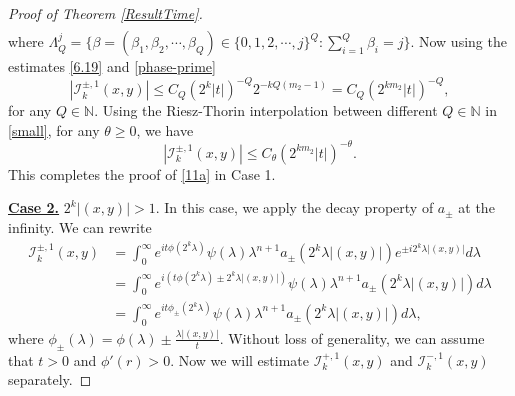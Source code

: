 \documentclass[a4paper,11pt, reqno]{amsart}
\numberwithin{equation}{section}
\theoremstyle{plain}
\theoremstyle{definition}
\theoremstyle{remark}
\begin{document}
\begin{proof}[Proof of Theorem \ref{ResultTime}]
\begin{equation*}
\begin{aligned}
    \end{aligned}
	\end{equation*}
 where $\Lambda_Q^j=\{\beta=(\beta_1,\beta_2,\cdots,\beta_Q)\in\{0,1,2,\cdots,j\}^Q: \sum\limits_{i=1}^Q\beta_i=j\}$. Now using the estimates \eqref{6.19} and \eqref{phase-prime}
 \begin{equation}\label{small}
|\mathcal{I}_k^{\pm,1}(x,y)|\leq C_Q \left(2^k|t|\right)^{-Q}2^{-kQ(m_2-1)}=C_Q\left(2^{km_2}|t|\right)^{-Q}, 
 \end{equation} for any $Q\in \mathbb N$. Using the Riesz-Thorin interpolation between different $Q\in\mathbb{N}$ in \eqref{small}, for any $\theta\geq0$, we have
\begin{equation}\label{sharp-s-small}
|\mathcal{I}_k^{\pm,1}(x,y)|\leq C_\theta\left(2^{km_2}|t|\right)^{-\theta}.
 \end{equation}  
 This completes the proof of \eqref{11a} in Case 1.   
 
\textbf{\underline{Case 2.}} $2^k|(x,y)|>1$. In this case, we apply the decay property of $a_\pm$ at the infinity. We can rewrite
\begin{align*}
\mathcal{I}_k^{\pm,1}(x,y)&=\int_0^\infty e^{it\phi(2^k\lambda)} \psi(\lambda)\lambda^{n+1}a_{\pm}(2^k\lambda|(x,y)|)e^{\pm i2^k\lambda|(x,y)|}d\lambda\\
   &=\int_0^\infty  e^{i\left(t\phi(2^k\lambda)\pm 2^k\lambda|(x,y)|\right)}\psi(\lambda)\lambda^{n+1}a_{\pm}(2^k\lambda|(x,y)|)d\lambda\\
   &=\int_0^\infty   e^{it\phi_\pm(2^k\lambda)}\psi(\lambda)\lambda^{n+1}a_{\pm}(2^k\lambda|(x,y)|)d\lambda,
\end{align*}
where $\phi_\pm(\lambda)=\phi(\lambda)\pm \frac{\lambda |(x,y)|}{t}$.
Without loss of generality, we can assume that $t>0$ and $\phi'(r)>0$. Now we will estimate $\mathcal{I}_k^{+,1}(x,y)$ and $\mathcal{I}_k^{-,1}(x,y)$ separately.


\end{proof}
\end{document}
